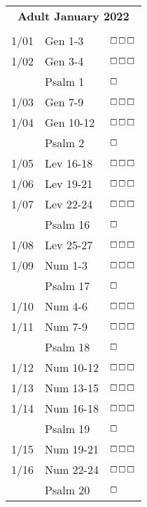 \documentclass[10pt,landscape,letterpaper]{article}
\begin{document}
\begin{multicols}{5}
\begin{tabular}{p{0.15in}p{0.7in}p{0.5in}}
\multicolumn{3}{c}{\textbf{Adult January 2022}} \\
& & \\
1/01 & Gen 1-3 & $\boxempty$$\boxempty$$\boxempty$ \\
1/02 & Gen 3-4 & $\boxempty$$\boxempty$$\boxempty$ \\
 & \textcolor[rgb]{0.98,0.00,0.00}{Psalm 1} & \textcolor[rgb]{1.00,0.00,0.00}{$\boxempty$} \\
1/03 & Gen 7-9 & $\boxempty$$\boxempty$$\boxempty$ \\
1/04 & Gen 10-12 & $\boxempty$$\boxempty$$\boxempty$ \\
 & \textcolor[rgb]{0.98,0.00,0.00}{Psalm 2} & \textcolor[rgb]{1.00,0.00,0.00}{$\boxempty$} \\
1/05 & Lev 16-18 & $\boxempty$$\boxempty$$\boxempty$ \\
1/06 & Lev 19-21 & $\boxempty$$\boxempty$$\boxempty$ \\
1/07 & Lev 22-24 & $\boxempty$$\boxempty$$\boxempty$ \\
 & \textcolor[rgb]{0.98,0.00,0.00}{Psalm 16} & \textcolor[rgb]{1.00,0.00,0.00}{$\boxempty$} \\
1/08 & Lev 25-27 & $\boxempty$$\boxempty$$\boxempty$ \\
1/09 & Num 1-3 & $\boxempty$$\boxempty$$\boxempty$ \\
 & \textcolor[rgb]{0.98,0.00,0.00}{Psalm 17} & \textcolor[rgb]{1.00,0.00,0.00}{$\boxempty$} \\
1/10 & Num 4-6 & $\boxempty$$\boxempty$$\boxempty$ \\
1/11 & Num 7-9 & $\boxempty$$\boxempty$$\boxempty$ \\
 & \textcolor[rgb]{0.98,0.00,0.00}{Psalm 18} & \textcolor[rgb]{1.00,0.00,0.00}{$\boxempty$} \\
1/12 & Num 10-12 & $\boxempty$$\boxempty$$\boxempty$ \\
1/13 & Num 13-15 & $\boxempty$$\boxempty$$\boxempty$ \\
1/14 & Num 16-18 & $\boxempty$$\boxempty$$\boxempty$ \\
 & \textcolor[rgb]{0.98,0.00,0.00}{Psalm 19} & \textcolor[rgb]{1.00,0.00,0.00}{$\boxempty$} \\
1/15 & Num 19-21 & $\boxempty$$\boxempty$$\boxempty$ \\
1/16 & Num 22-24 & $\boxempty$$\boxempty$$\boxempty$ \\
 & \textcolor[rgb]{0.98,0.00,0.00}{Psalm 20} & \textcolor[rgb]{1.00,0.00,0.00}{$\boxempty$} \\

\end{tabular}
\end{multicols}
\end{document}
